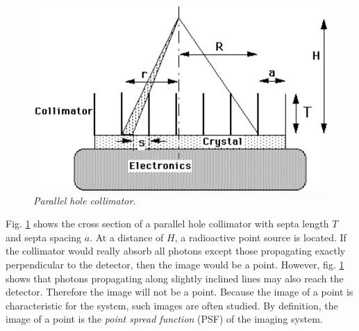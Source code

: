 \begin{figure}[tb]
\centering
\includegraphics[width=\figone]{figs/fig_collimator_calc.pdf}
\caption{\label{fig:collimator_calc} \emph{Parallel hole collimator.}}
\end{figure}

Fig. \ref{fig:collimator_calc} shows the cross section of a parallel
hole collimator with septa length $T$ and septa spacing $a$. At a
distance of $H$, a radioactive point source is located.  If the
collimator would really absorb all photons except those propagating
exactly perpendicular to the detector, then the image would be a
point.  However, fig. \ref{fig:collimator_calc} shows that photons
propagating along slightly inclined lines may also reach the detector.
Therefore the image will not be a point. Because the image of a point
is characteristic for the system, such images are often studied. By
definition, the image of a point is the {\em point spread function}
(PSF) of the imaging system. 

